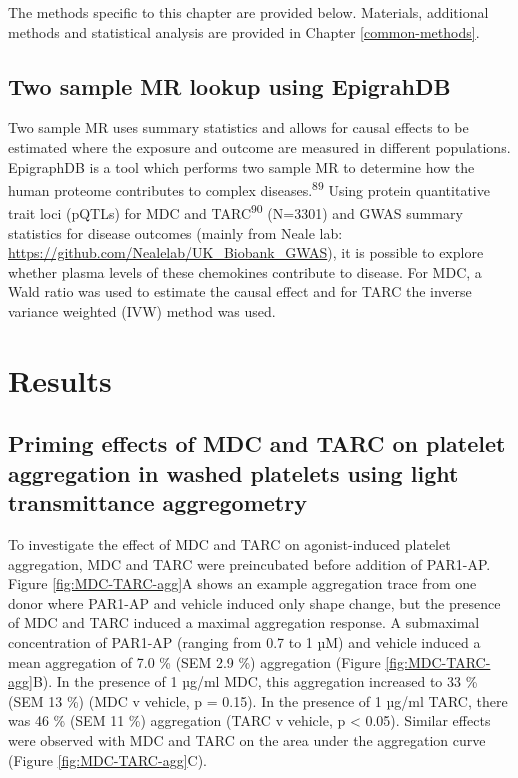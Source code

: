 \documentclass[11pt,twoside]{bristolthesis}
\begin{document}
The methods specific to this chapter are provided below. Materials, additional methods and statistical analysis are provided in Chapter \ref{common-methods}.

\hypertarget{two-sample-mr-lookup-using-epigrahdb}{%
\subsection{Two sample MR lookup using EpigrahDB}\label{two-sample-mr-lookup-using-epigrahdb}}

Two sample MR uses summary statistics and allows for causal effects to be estimated where the exposure and outcome are measured in different populations. EpigraphDB is a tool which performs two sample MR to determine how the human proteome contributes to complex diseases.\textsuperscript{89} Using protein quantitative trait loci (pQTLs) for MDC and TARC\textsuperscript{90} (N=3301) and GWAS summary statistics for disease outcomes (mainly from Neale lab: \url{https://github.com/Nealelab/UK_Biobank_GWAS}), it is possible to explore whether plasma levels of these chemokines contribute to disease. For MDC, a Wald ratio was used to estimate the causal effect and for TARC the inverse variance weighted (IVW) method was used.

\hypertarget{results-2}{%
\section{Results}\label{results-2}}

\hypertarget{priming-effects-of-mdc-and-tarc-on-platelet-aggregation-in-washed-platelets-using-light-transmittance-aggregometry}{%
\subsection{Priming effects of MDC and TARC on platelet aggregation in washed platelets using light transmittance aggregometry}\label{priming-effects-of-mdc-and-tarc-on-platelet-aggregation-in-washed-platelets-using-light-transmittance-aggregometry}}

To investigate the effect of MDC and TARC on agonist-induced platelet aggregation, MDC and TARC were preincubated before addition of PAR1-AP. Figure \ref{fig:MDC-TARC-agg}A shows an example aggregation trace from one donor where PAR1-AP and vehicle induced only shape change, but the presence of MDC and TARC induced a maximal aggregation response. A submaximal concentration of PAR1-AP (ranging from 0.7 to 1 µM) and vehicle induced a mean aggregation of 7.0 \% (SEM 2.9 \%) aggregation (Figure \ref{fig:MDC-TARC-agg}B). In the presence of 1 µg/ml MDC, this aggregation increased to 33 \% (SEM 13 \%) (MDC v vehicle, p = 0.15). In the presence of 1 µg/ml TARC, there was 46 \% (SEM 11 \%) aggregation (TARC v vehicle, p \textless{} 0.05). Similar effects were observed with MDC and TARC on the area under the aggregation curve (Figure \ref{fig:MDC-TARC-agg}C).
\end{document}
